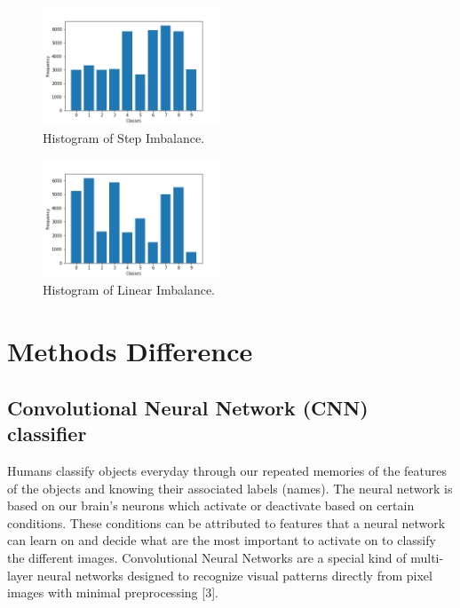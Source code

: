\documentclass[Dealing with Imbalance in Computer Vision]{IEEEtran}
\begin{document}
\begin{figure}[]
\centerline{\includegraphics [width=200px]{dist step.png}}
\caption{Histogram of Step Imbalance.}
\label{fig1}
\end{figure}
\begin{figure}[]
\centerline{\includegraphics[width=200px]{dist linear.png}}
\caption{Histogram of Linear Imbalance.}
\label{fig2}
\end{figure}

\section{Methods Difference}
\subsection{Convolutional Neural Network (CNN) classifier}
Humans classify objects everyday through our repeated memories of the features of the objects and knowing their associated labels (names). The neural network is based on our brain's neurons which activate or deactivate based on certain conditions. These conditions can be attributed to features that a neural network can learn on and decide what are the most important to activate on to classify the different images. Convolutional Neural Networks are a special kind of multi-layer neural networks designed to recognize visual patterns directly from pixel images  with  minimal preprocessing [3].
\end{document}
